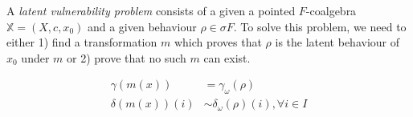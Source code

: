 \begin{definition}
A \emph{latent vulnerability problem} consists of a given a pointed $F$-coalgebra $\mathbb{X}=(X,c,x_0)$ and a given behaviour $\rho\in \sigma F$. To solve this problem, we need to either 1) find a transformation $m$ which proves that $\rho$ is the latent behaviour of $x_0$ under $m$ or 2) prove that no such $m$ can exist.
\end{definition}


\begin{align}
\gamma(m(x))&=\gamma_\omega(\rho)\\
\delta(m(x))(i)&\sim \delta_\omega(\rho)(i), \forall i\in I
\end{align}



